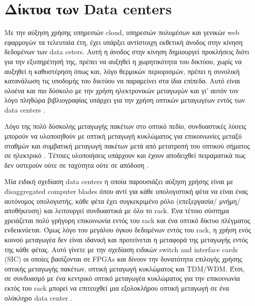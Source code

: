 \section{Δίκτυα των Data centers}

Με την αύξηση χρήσης υπηρεσιών cloud, υπηρεσιών πολυμέσων και
γενικών web εφαρμογών τα τελευταία έτη, έχει υπάρξει αντίστοιχη
εκθετική άνοδος στην κίνηση δεδομένων των data ceters. Αυτή η άνοδος
στην κίνηση δημιουργεί προκλήσεις διότι για την εξυπηρέτησή της,
πρέπει να αυξηθεί η χωρητικότητα του δικτύου, χωρίς να αυξηθεί η
καθυστέρηση όπως και, λόγο θερμικών περιορισμών, πρέπει η συνολική
κατανάλωση τις υποδομής του δικτύου να παραμείνει στα ίδια
επίπεδα. Αυτό είναι ολοένα και πιο δύσκολο με την χρήση ηλεκτρονικών
μεταγωγών και γι' αυτόν τον λόγο πληθώρα βιβλιογραφίας υπάρχει για την
χρήση οπτικών μεταγωγέων εντός των data centers \cite{6129370}.

Λόγο της πολύ δύσκολης μεταγωγής πακέτων στο οπτικό πεδίο,
συνδυαστικές λύσεις μπορούν να υλοποιηθούν με οπτική μεταγωγή
κυκλώματος για επικοινωνίες μεταξύ σταθμών και συμβατική μεταγωγή
πακέτων μετά από μετατροπή του οπτικού σήματος σε ηλεκτρικό
\cite{6533163Farrington:2010:HHE:1851182.1851223}. Τέτοιες υλοποιήσεις
υπάρχουν και έχουν αποδειχθεί πειραματικά πως δεν υστερούν ούτε σε
ταχύτητα ούτε σε απόδοση \cite{6533163}.

Μία ειδική σχεδίαση data centers η οποία παρουσιάζει αύξηση χρήσης
είναι με disaggregated computer blades όπου αντί για κάθε υπολογιστική
φέτα να είναι ένας αυτόνομος υπολογιστής, κάθε φέτα έχει συγκεκριμένο
ρόλο (επεξεργασία/ μνήμη/ αποθήκευση) και λειτουργεί συνδυαστικά με
όλο το rack. Ένα τέτοιο σύστημα χρειάζεται πολύ γρήγορη επικοινωνία
εντός του rack και ένα οπτικό δίκτυο πλέγματος ενδεικνύεται. Όμως λόγο
του μεγάλου όγκου δεδομένων εντός του rack, η χρήση ενός κοινού
μεταγωγέα δεν είναι ιδανική και προτείνεται η μεταφορά της μεταγωγής
εντός της κάθε φέτας. Αυτό γίνετε με την σχεδίαση ειδικών switch and
interface cards (SIC) οι οποίες βασίζονται σε FPGAs και δίνουν την
δυνατότητα επιλογής χρήσης οπτικής μεταγωγής πακέτων, οπτική μεταγωγή
κυκλώματος και TDM/WDM. Έτσι, σε συνδυασμό με ένα κεντρικό οπτικό
μεταγωγέα κυκλώματος για την επικοινωνία εκτός του rack μπορεί να
επιτευχθεί μια εξολοκλήρου οπτική μεταγωγή σε ένα ολόκληρο data
center \cite{7383226}.

 
